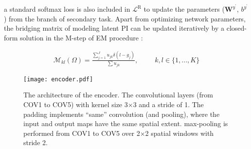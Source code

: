 \documentclass[10pt,twocolumn,letterpaper]{article}
\begin{document}
a standard softmax loss is also included in $\mathcal{L}^{\mathrm{R}}$ to update the parameters (\eg $\bm{W}^{y^{\prime}}$, $b^{y^{\prime}}$) from the branch of secondary task. Apart from optimizing network parameters, the bridging matrix of modeling latent PI can be updated iteratively by a closed-form solution in the M-step of EM procedure \cite{mclachlan2007algorithm, Shi_2015_tpami,Alan_2016_icassp}:

\begin{align}
\bm{\mathcal{M}}_{kl}(\Omega) = \frac{\sum_{j=1}^{J} u_{jk} \delta(l-g_j)}{\sum u_{jk}}, \ \ \qquad  k,l \in \{1,...,K\}
\label{eg:bridge_matrix}
\end{align}

\begin{figure*}[t]
\centering
   \texttt{[image: encoder.pdf]}
 
\caption{The architecture of the encoder. The convolutional layers (from COV1 to COV5) with kernel size 3$\times$3 and a stride of 1. The padding implements “same” convolution (and pooling), where the input and output maps have the same spatial extent. max-pooling is performed from COV1 to COV5 over 2$\times$2 spatial windows with stride 2.}
\label{fig:encoder}
\end{figure*}

\end{document}
